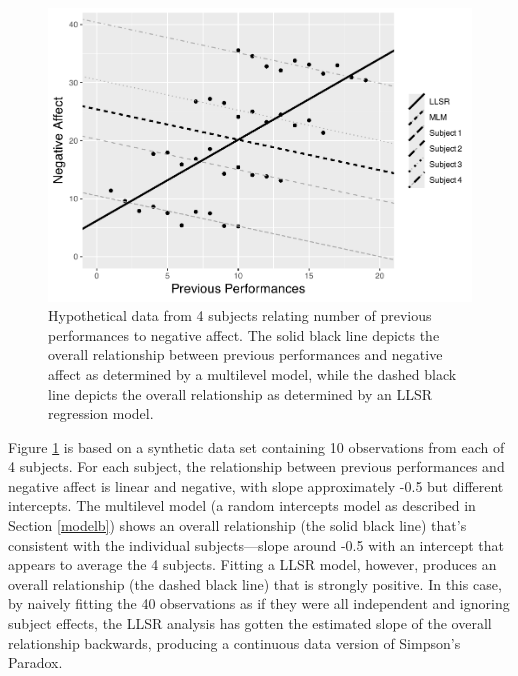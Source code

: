 \documentclass[
]{krantz}
\begin{document}
\begin{figure}

{\centering \includegraphics[width=0.6\linewidth]{bookdown-BeyondMLR_files/figure-latex/mli-spag2-1} 

}

\caption{Hypothetical data from 4 subjects relating number of previous performances to negative affect.  The solid black line depicts the overall relationship between previous performances and negative affect as determined by a multilevel model, while the dashed black line depicts the overall relationship as determined by an LLSR regression model.}\label{fig:mli-spag2}
\end{figure}

Figure \ref{fig:mli-spag2} is based on a synthetic data set containing 10 observations from each of 4 subjects. For each subject, the relationship between previous performances and negative affect is linear and negative, with slope approximately -0.5 but different intercepts. The multilevel model (a random intercepts model as described in Section \ref{modelb}) shows an overall relationship (the solid black line) that's consistent with the individual subjects---slope around -0.5 with an intercept that appears to average the 4 subjects. Fitting a LLSR model, however, produces an overall relationship (the dashed black line) that is strongly positive. In this case, by naively fitting the 40 observations as if they were all independent and ignoring subject effects, the LLSR analysis has gotten the estimated slope of the overall relationship backwards, producing a continuous data version of Simpson's Paradox.
\end{document}
